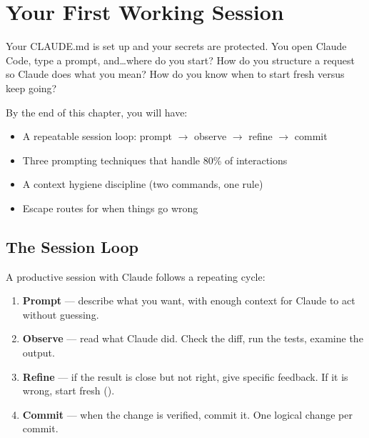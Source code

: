 \chapter{Your First Working Session}
\label{ch:first-session}

\begin{itshape}
Your CLAUDE.md is set up and your secrets are protected.
You open Claude Code, type a prompt, and\ldots where do you start?
How do you structure a request so Claude does what you mean?
How do you know when to start fresh versus keep going?
\end{itshape}

By the end of this chapter, you will have:
\begin{itemize}
  \item A repeatable session loop: prompt $\rightarrow$ observe $\rightarrow$ refine $\rightarrow$ commit
  \item Three prompting techniques that handle 80\% of interactions
  \item A context hygiene discipline (two commands, one rule)
  \item Escape routes for when things go wrong
\end{itemize}

\section{The Session Loop}
\label{sec:session-loop}

A productive session with Claude follows a repeating cycle:

\begin{keybox}
\begin{enumerate}
  \item \textbf{Prompt} --- describe what you want, with enough context
    for Claude to act without guessing.
  \item \textbf{Observe} --- read what Claude did. Check the diff, run the tests,
    examine the output.
  \item \textbf{Refine} --- if the result is close but not right, give specific
    feedback. If it is wrong, start fresh ().
  \item \textbf{Commit} --- when the change is verified, commit it.
    One logical change per commit.
\end{enumerate}
\end{keybox}

